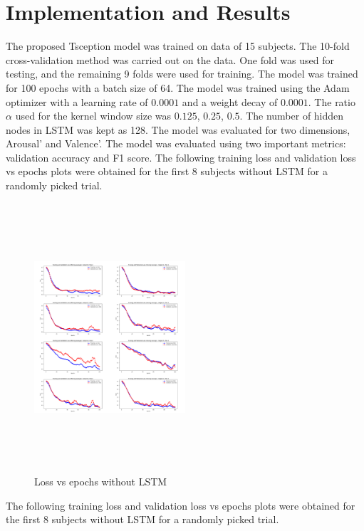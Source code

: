 \section{Implementation and Results}
The proposed Tsception model was trained on data of 15 subjects. The 10-fold cross-validation method was carried out on the data. One fold was used for testing, and the remaining 9 folds were used for training. The model was trained for 100 epochs with a batch size of 64. The model was trained using the Adam optimizer with a learning rate of $0.0001$ and a weight decay of $0.0001$. The ratio $\alpha$ used for the kernel window size was $0.125$, $0.25$, $0.5$. The number of hidden nodes in LSTM was kept as 128. The model was evaluated for two dimensions, Arousal' and Valence'. The model was evaluated using two important metrics: validation accuracy and F1 score.
The following training loss and validation loss vs epochs plots were obtained for the first 8 subjects without LSTM for a randomly picked trial.
\begin{figure}[h]
    \centering
    \includegraphics[width=0.5\textwidth, height = 10cm]{combined.png} %
    \caption{Loss vs epochs without LSTM} %
    \label{loss vs epoch without LSTM} %
\end{figure}

The following training loss and validation loss vs epochs plots were obtained for the first 8 subjects without LSTM for a randomly picked trial.

